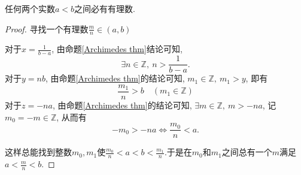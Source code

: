 \begin{proposition}
    任何两个实数$a<b$之间必有有理数.
\end{proposition}
\begin{proof}寻找一个有理数$\frac{m}{n} \in (a,b)$

    对于$x = \frac{1}{b-a}$, 由命题\ref{Archimedes thm}结论可知,
    \begin{equation}
        \exists n \in \mathbb{Z}, \ n > \frac{1}{b-a}.
    \end{equation}
    对于$y = nb$, 由命题\ref{Archimedes thm}的结论可知, $m_1 \in \mathbb{Z}, \ m_1 > y $, 即有
    \begin{equation}
      \frac{m_1}{n}>b \quad (m_1 \in  \mathbb{Z})
    \end{equation}
    对于$z = -na$, 由命题\ref{Archimedes thm}的结论可知, $\exists m \in \mathbb{Z},\ m > -na$, 记$m_0 = -m \in \mathbb{Z}$, 从而有 
    \begin{equation}
        -m_0 > -na \iff \frac{m_0}{n} < a.
    \end{equation}

    这样总能找到整数$m_0,m_1$使$\frac{m_0}{n}<a < b < \frac{m_1}{n}$.于是在$m_0$和$m_1$之间总有一个$m$满足$a < \frac{m}{n} < b$.
\end{proof}